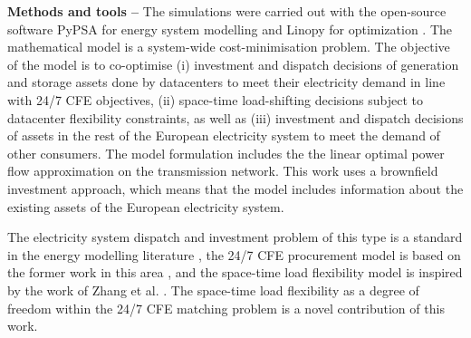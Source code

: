 %

\textbf{Methods and tools --} The simulations were carried out with the open-source software PyPSA for energy system modelling \cite{horschPyPSAEurOpenOptimisation2018} and Linopy for optimization \cite{LinopyLinearOptimization2024}.
The mathematical model is a system-wide cost-minimisation problem. 
The objective of the model is to co-optimise (i) investment and dispatch decisions of generation and storage assets done by datacenters to meet their electricity demand in line with 24/7 CFE objectives, (ii) space-time load-shifting decisions subject to datacenter flexibility constraints, as well as (iii) investment and dispatch decisions of assets in the rest of the European electricity system to meet the demand of other consumers.
The model formulation includes the the linear optimal power flow approximation on the transmission network. 
This work uses a brownfield investment approach, which means that the model includes information about the existing assets of the European electricity system. 

The electricity system dispatch and investment problem of this type is a standard in the energy modelling literature \cite{OpenModelsWikib}, the 24/7 CFE procurement model is based on the former work in this area \cite{riepinMeansCostsSystemlevel2023, xu-247CFE-report}, and the space-time load flexibility model is inspired by the work of Zhang et al. \cite{zhangRemuneratingSpaceTime2022}. The space-time load flexibility as a degree of freedom within the 24/7 CFE matching problem is a novel contribution of this work.
